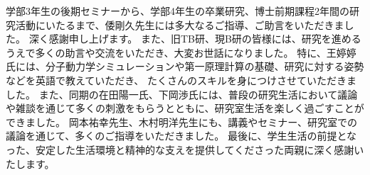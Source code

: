 学部3年生の後期セミナーから、学部4年生の卒業研究、博士前期課程2年間の研究活動にいたるまで、倭剛久先生には多大なるご指導、ご助言をいただきました。
深く感謝申し上げます。
また、旧TB研、現B研の皆様には、研究を進めるうえで多くの助言や交流をいただき、大変お世話になりました。
特に、王婷婷氏には、分子動力学シミュレーションや第一原理計算の基礎、研究に対する姿勢などを英語で教えていただき、
たくさんのスキルを身につけさせていただきました。
また、同期の在田陽一氏、下岡渉氏には、普段の研究生活において議論や雑談を通じて多くの刺激をもらうとともに、研究室生活を楽しく過ごすことができました。
岡本祐幸先生、木村明洋先生にも、講義やセミナー、研究室での議論を通じて、多くのご指導をいただきました。
最後に、学生生活の前提となった、安定した生活環境と精神的な支えを提供してくださった両親に深く感謝いたします。
